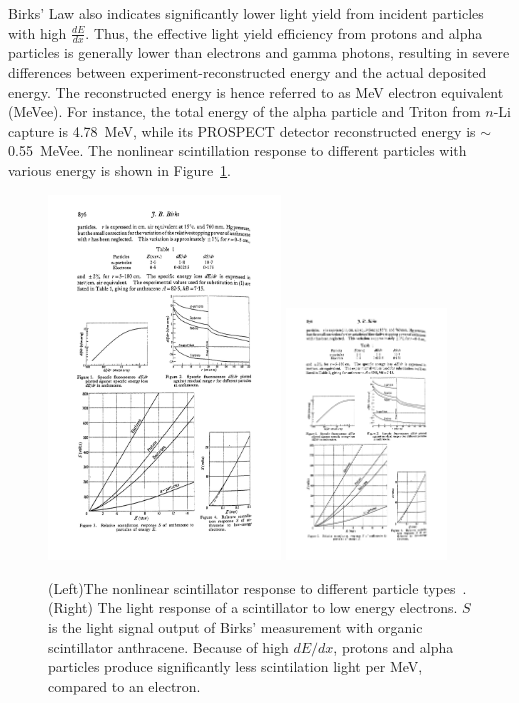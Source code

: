 Birks' Law also indicates significantly lower light yield from incident particles with high $\frac{dE}{dx}$.
Thus, the effective light yield efficiency from protons and alpha particles is generally lower than electrons and gamma photons, resulting in severe differences between experiment-reconstructed energy and the actual deposited energy.
The reconstructed energy is hence referred to as MeV electron equivalent (MeVee).
For instance, the total energy of the alpha particle and Triton from $n$-Li capture is 4.78~MeV, while its PROSPECT detector reconstructed energy is $\sim$0.55~MeVee.
The nonlinear scintillation response to different particles with various energy is shown in Figure~\ref{fig:birks}.

\begin{figure}[h!]
    \centering
    \includegraphics[width=0.55\textwidth]{Figures/BirksNonlinearHigh.pdf}
    \includegraphics[width=0.38\textwidth]{Figures/BirksNonlinearLow.pdf}
    \caption[Quenched scintillator light response]{
     (Left)The nonlinear scintillator response to different particle types~\cite{bib:birks}.
	(Right) The light response of a scintillator to low energy electrons.
    $S$ is the light signal output of Birks' measurement with organic scintillator anthracene.
    Because of high $dE/dx$, protons and alpha particles produce significantly less scintilation light per MeV, compared to an electron.
    }
    \label{fig:birks}
\end{figure}

